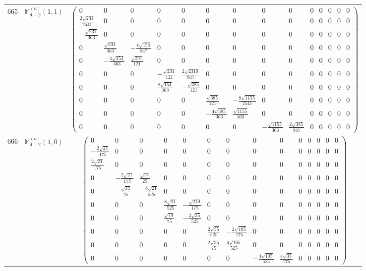 \documentclass[fleqn,8pt,landscape]{jsarticle}
\begin{document}
\begin{center}
\begin{longtable}{ccc}
$ 665 $ & $ \mathbb{M}_{4,-2}^{(a)}(1,1) $ & $ \begin{pmatrix} 0 & 0 & 0 & 0 & 0 & 0 & 0 & 0 & 0 & 0 & 0 & 0 & 0 & 0 \\ \frac{2 \sqrt{231}}{2541} & 0 & 0 & 0 & 0 & 0 & 0 & 0 & 0 & 0 & 0 & 0 & 0 & 0 \\ - \frac{\sqrt{231}}{363} & 0 & 0 & 0 & 0 & 0 & 0 & 0 & 0 & 0 & 0 & 0 & 0 & 0 \\ 0 & \frac{\sqrt{231}}{363} & - \frac{4 \sqrt{154}}{847} & 0 & 0 & 0 & 0 & 0 & 0 & 0 & 0 & 0 & 0 & 0 \\ 0 & - \frac{4 \sqrt{154}}{363} & \frac{\sqrt{231}}{121} & 0 & 0 & 0 & 0 & 0 & 0 & 0 & 0 & 0 & 0 & 0 \\ 0 & 0 & 0 & - \frac{\sqrt{231}}{121} & \frac{2 \sqrt{2310}}{847} & 0 & 0 & 0 & 0 & 0 & 0 & 0 & 0 & 0 \\ 0 & 0 & 0 & \frac{8 \sqrt{154}}{363} & - \frac{\sqrt{385}}{121} & 0 & 0 & 0 & 0 & 0 & 0 & 0 & 0 & 0 \\ 0 & 0 & 0 & 0 & 0 & \frac{\sqrt{385}}{121} & - \frac{8 \sqrt{1155}}{2541} & 0 & 0 & 0 & 0 & 0 & 0 & 0 \\ 0 & 0 & 0 & 0 & 0 & - \frac{4 \sqrt{385}}{363} & \frac{\sqrt{1155}}{363} & 0 & 0 & 0 & 0 & 0 & 0 & 0 \\ 0 & 0 & 0 & 0 & 0 & 0 & 0 & - \frac{\sqrt{1155}}{363} & \frac{2 \sqrt{385}}{847} & 0 & 0 & 0 & 0 & 0 \end{pmatrix} $ \\ \hline
$ 666 $ & $ \mathbb{M}_{4,-2}^{(a)}(1,0) $ & $ \begin{pmatrix} 0 & 0 & 0 & 0 & 0 & 0 & 0 & 0 & 0 & 0 & 0 & 0 & 0 & 0 \\ - \frac{2 \sqrt{21}}{175} & 0 & 0 & 0 & 0 & 0 & 0 & 0 & 0 & 0 & 0 & 0 & 0 & 0 \\ \frac{2 \sqrt{21}}{175} & 0 & 0 & 0 & 0 & 0 & 0 & 0 & 0 & 0 & 0 & 0 & 0 & 0 \\ 0 & - \frac{2 \sqrt{21}}{175} & \frac{\sqrt{14}}{25} & 0 & 0 & 0 & 0 & 0 & 0 & 0 & 0 & 0 & 0 & 0 \\ 0 & - \frac{\sqrt{14}}{25} & - \frac{8 \sqrt{21}}{525} & 0 & 0 & 0 & 0 & 0 & 0 & 0 & 0 & 0 & 0 & 0 \\ 0 & 0 & 0 & \frac{8 \sqrt{21}}{525} & - \frac{\sqrt{210}}{175} & 0 & 0 & 0 & 0 & 0 & 0 & 0 & 0 & 0 \\ 0 & 0 & 0 & \frac{\sqrt{14}}{75} & - \frac{2 \sqrt{35}}{525} & 0 & 0 & 0 & 0 & 0 & 0 & 0 & 0 & 0 \\ 0 & 0 & 0 & 0 & 0 & \frac{2 \sqrt{35}}{525} & - \frac{2 \sqrt{105}}{175} & 0 & 0 & 0 & 0 & 0 & 0 & 0 \\ 0 & 0 & 0 & 0 & 0 & \frac{2 \sqrt{35}}{75} & \frac{4 \sqrt{105}}{525} & 0 & 0 & 0 & 0 & 0 & 0 & 0 \\ 0 & 0 & 0 & 0 & 0 & 0 & 0 & - \frac{4 \sqrt{105}}{525} & \frac{4 \sqrt{35}}{175} & 0 & 0 & 0 & 0 & 0 \end{pmatrix} $ \\ \hline

\end{longtable}
\end{center}
\end{document}

